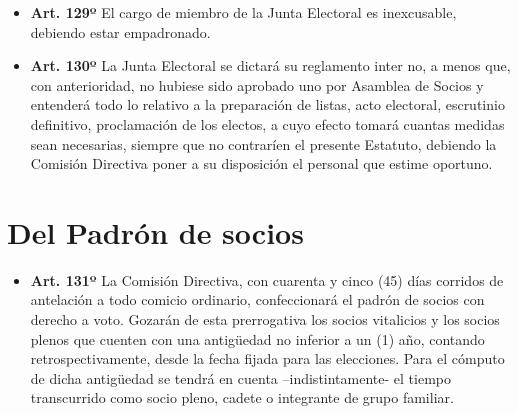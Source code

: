 \documentclass[]{book}
\providecommand{\tightlist}{%
  \setlength{\itemsep}{0pt}\setlength{\parskip}{0pt}}
\begin{document}
\begin{itemize}
\tightlist
\item
  \textbf{Art. 129º} El cargo de miembro de la Junta Electoral es
  inexcusable, debiendo estar empadronado.
\end{itemize}

\begin{itemize}
\tightlist
\item
  \textbf{Art. 130º} La Junta Electoral se dictará su reglamento inter
  no, a menos que, con anterioridad, no hubiese sido aprobado uno por
  Asamblea de Socios y entenderá todo lo relativo a la preparación de
  listas, acto electoral, escrutinio definitivo, proclamación de los
  electos, a cuyo efecto tomará cuantas medidas sean necesarias, siempre
  que no contraríen el presente Estatuto, debiendo la Comisión Directiva
  poner a su disposición el personal que estime oportuno.
\end{itemize}

\section{Del Padrón de socios}\label{del-padron-de-socios}

\begin{itemize}
\tightlist
\item
  \textbf{Art. 131º} La Comisión Directiva, con cuarenta y cinco (45)
  días corridos de antelación a todo comicio ordinario, confeccionará el
  padrón de socios con derecho a voto. Gozarán de esta prerrogativa los
  socios vitalicios y los socios plenos que cuenten con una antigüedad
  no inferior a un (1) año, contando retrospectivamente, desde la fecha
  fijada para las elecciones. Para el cómputo de dicha antigüedad se
  tendrá en cuenta --indistintamente- el tiempo transcurrido como socio
  pleno, cadete o integrante de grupo familiar.
\end{itemize}
\end{document}
